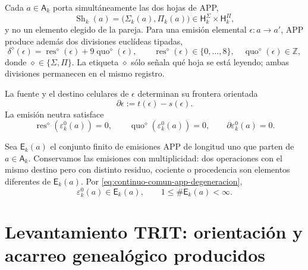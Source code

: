 Cada \(a\in\mathsf A_k\) porta simultáneamente las dos hojas de APP,
\begin{equation}
\label{eq:continuo-comun-dos-hojas}
 \operatorname{Sh}_k(a)
 =\bigl(\Sigma_k(a),\Pi_k(a)\bigr)
 \in\mathsf H_k^{\Sigma}\times\mathsf H_k^{\Pi},
\end{equation}
y no un elemento elegido de la pareja.  Para una emisión elemental
\(\epsilon:a\to a'\), APP produce además dos divisiones euclídeas tipadas,
\begin{equation}
\label{eq:continuo-comun-residuo-cociente-app}
 \delta^{\diamond}(\epsilon)
 =\operatorname{res}^{\diamond}(\epsilon)
  +9\operatorname{quo}^{\diamond}(\epsilon),
 \qquad
 \operatorname{res}^{\diamond}(\epsilon)\in\{0,\ldots,8\},
 \quad
 \operatorname{quo}^{\diamond}(\epsilon)\in\mathbb Z,
\end{equation}
donde \(\diamond\in\{\Sigma,\Pi\}\).  La etiqueta \(\diamond\) sólo señala
qué hoja se está leyendo; ambas divisiones permanecen en el mismo registro.

La fuente y el destino celulares de \(\epsilon\) determinan su frontera
orientada
\begin{equation}
\label{eq:continuo-comun-frontera-elemental}
 \partial\epsilon:=t(\epsilon)-s(\epsilon).
\end{equation}
La emisión neutra satisface
\begin{equation}
\label{eq:continuo-comun-neutral-app-datos}
 \operatorname{res}^{\diamond}(\varepsilon^0_k(a))=0,
 \qquad
 \operatorname{quo}^{\diamond}(\varepsilon^0_k(a))=0,
 \qquad
 \partial\varepsilon^0_k(a)=0.
\end{equation}

\begin{definition}
\label{def:continuo-comun-grafo-app}
Sea \(\mathsf E_k(a)\) el conjunto finito de emisiones APP de longitud uno
que parten de \(a\in\mathsf A_k\).  Conservamos las emisiones con
multiplicidad: dos operaciones con el mismo destino pero con distinto
residuo, cociente o procedencia son elementos diferentes de
\(\mathsf E_k(a)\).  Por \eqref{eq:continuo-comun-app-degeneracion},
\begin{equation}
\label{eq:continuo-comun-out-no-vacio-app}
 \varepsilon^0_k(a)\in\mathsf E_k(a),
 \qquad
 1\leq \#\mathsf E_k(a)<\infty.
\end{equation}
\end{definition}

\section{Levantamiento TRIT: orientación y acarreo genealógico producidos}
\label{sec:continuo-comun-trit-lift}

